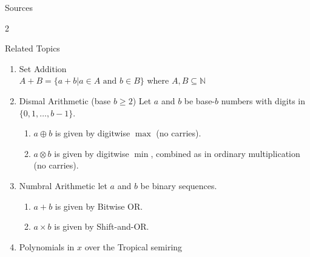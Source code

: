 \documentclass{beamer}
\newcommand{\N}{\mathbb{N}}
\begin{document}
    


    

    \begin{frame}[shrink=15]{Sources}
        \small
        \begin{multicols}{2}
            
            
            \nocite{*}
        \end{multicols}        
    \end{frame}
    
    \begin{frame}{Related Topics}
        \begin{enumerate}
            \item Set Addition\\
                $A+B = \{a+b|a \in A \text{ and } b \in B\}$ where $A,B \subseteq \N$
            \item Dismal Arithmetic (base $b \ge 2$)
                Let $a$ and $b$ be base-$b$ numbers with digits in $\{0,1,\dots,b-1\}$.
                \begin{enumerate}
                    \item $a \oplus b$ is given by digitwise $\max$ (no carries).
                    \item $a \otimes b$ is given by digitwise $\min$, combined as in ordinary multiplication (no carries).
                \end{enumerate} 
            \item Numbral Arithmetic
                let $a$ and $b$ be binary sequences.
                \begin{enumerate}    
                    \item $a+b$ is given by Bitwise OR.
                    \item $a \times b$ is given by Shift-and-OR.
                \end{enumerate}
            \item Polynomials in $x$ over the Tropical semiring
        \end{enumerate}
    \end{frame}
\end{document}
